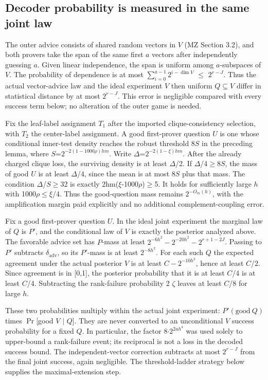 \subsection{Decoder probability is measured in the same joint law}
The outer advice consists of shared random vectors in \(V\) (MZ Section 3.2), and both provers take the span of the same first \(a\) vectors after independently guessing \(a\). Given linear independence, the span is uniform among \(a\)-subspaces of \(V\). The probability of dependence is at most \(\sum_{i=0}^{a-1}2^{i-\dim V}\) \(\le\) \(2^{r-J}\). Thus the actual vector-advice law and the ideal experiment \(V\) then uniform \(Q\subseteq V\) differ in statistical distance by at most \(2^{r-J}\). This error is negligible compared with every success term below; no alteration of the outer game is needed.

Fix the leaf-label assignment \(T_1\) after the imported clique-consistency selection, with \(T_2\) the center-label assignment. A good first-prover question \(U\) is one whose conditional inner-test density reaches the robust threshold 8\(S\) in the preceding lemma, where \(S\)=\(2^{-2(1-1000\rho)hm}\). Write \(\Delta\)=\(2^{-2(1-\xi)hm}\). After the already charged clique loss, the surviving density is at least \(\Delta\)/2. If \(\Delta\)/4\(\ge\)8\(S\), the mass of good \(U\) is at least \(\Delta\)/4, since the mean is at most 8\(S\) plus that mass. The condition \(\Delta\)/\(S\)\(\ge\)32 is exactly 2hm(\(\xi\)-1000\(\rho\))\(\ge\)5. It holds for sufficiently large \(h\) with 1000\(\rho\)\(\le\)\(\xi\)/4. Thus the good-question mass remains \(2^{-O_m(h)}\), with the amplification margin paid explicitly and no additional complement-coupling error.

Fix a good first-prover question \(U\). In the ideal joint experiment the marginal law of \(Q\) is \(P'\), and the conditional law of \(V\) is exactly the posterior analyzed above. The favorable advice set has \(P\)-mass at least \(2^{-6h^2}-2^{-20h^2}-2^{r+1-2J}\). Passing to \(P'\) subtracts \(\delta_{\mathrm{adv}}\), so its \(P'\)-mass is at least \(2^{-8h^2}\). For each such \(Q\) the expected agreement under the actual posterior \(V\) is at least \(C-2^{-10h^2}\), hence at least \(C\)/2. Since agreement is in [0,1], the posterior probability that it is at least \(C\)/4 is at least \(C\)/4. Subtracting the rank-failure probability 2 \(\zeta\) leaves at least \(C\)/8 for large \(h\).

These two probabilities multiply within the actual joint experiment: \(P'(\mathrm{good}\ Q)\) times \(\Pr\)[good \(V\) \(\mid\) \(Q\)]. They are never converted to an unconditional \(V\) success probability for a fixed \(Q\). In particular, the factor 8\(\cdot\)\(2^{2a h^4}\) was used solely to upper-bound a rank-failure event; its reciprocal is not a loss in the decoded success bound. The independent-vector correction subtracts at most \(2^{r-J}\) from the final joint success, again negligible. The threshold-ladder strategy below supplies the maximal-extension step.

